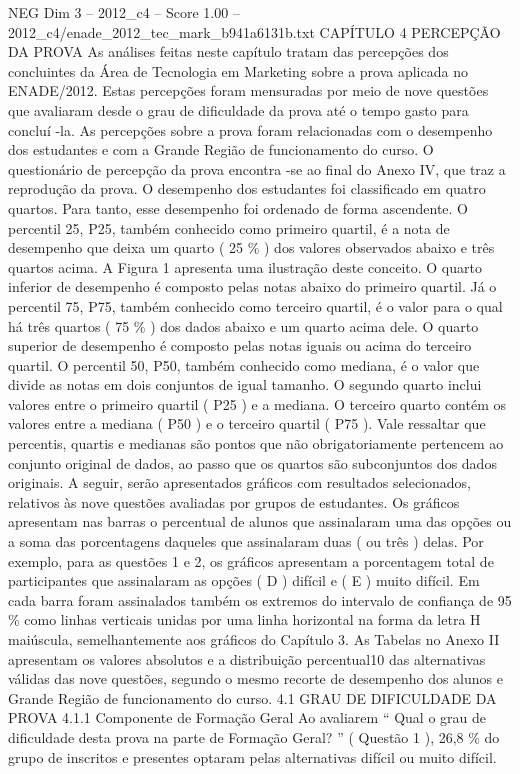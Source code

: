 \begin{textsample}{NEG Dim 3 – 2012\_c4 – Score 1.00 – 2012\_c4/enade\_2012\_tec\_mark\_b941a6131b.txt}  \label{ex:f3_neg_130}
CAPÍTULO 4 PERCEPÇÃO DA PROVA As análises feitas neste capítulo tratam das percepções dos concluintes da Área de Tecnologia em Marketing sobre a prova aplicada no ENADE/2012.
Estas percepções foram mensuradas por meio de nove questões que avaliaram desde o grau de dificuldade da prova até o tempo gasto para concluí -la.
As percepções sobre a prova foram relacionadas com o desempenho dos estudantes e com a Grande Região de funcionamento do curso.
O questionário de percepção da prova encontra -se ao final do Anexo IV, que traz a reprodução da prova.
O desempenho dos estudantes foi classificado em quatro quartos.
Para tanto, esse desempenho foi ordenado de forma ascendente.
O percentil 25, P25, também conhecido como primeiro quartil, é a nota de desempenho que deixa um quarto ( 25 \% ) dos valores observados abaixo e três quartos acima.
A Figura 1 apresenta uma ilustração deste conceito.
O quarto inferior de desempenho é composto pelas notas abaixo do primeiro quartil.
Já o percentil 75, P75, também conhecido como terceiro quartil, é o valor para o qual há três quartos ( 75 \% ) dos dados abaixo e um quarto acima dele.
O quarto superior de desempenho é composto pelas notas iguais ou acima do terceiro quartil.
O percentil 50, P50, também conhecido como mediana, é o valor que divide as notas em dois conjuntos de igual tamanho.
O segundo quarto inclui valores entre o primeiro quartil ( P25 ) e a mediana.
O terceiro quarto contém os valores entre a mediana ( P50 ) e o terceiro quartil ( P75 ).
Vale ressaltar que percentis, quartis e medianas são pontos que não obrigatoriamente pertencem ao conjunto original de dados, ao passo que os quartos são subconjuntos dos dados originais.
A seguir, serão apresentados gráficos com resultados selecionados, relativos às nove questões avaliadas por grupos de estudantes.
Os gráficos apresentam nas barras o percentual de alunos que assinalaram uma das opções ou a soma das porcentagens daqueles que assinalaram duas ( ou três ) delas.
Por exemplo, para as questões 1 e 2, os gráficos apresentam a porcentagem total de participantes que assinalaram as opções ( D ) difícil e ( E ) muito difícil.
Em cada barra foram assinalados também os extremos do intervalo de confiança de 95 \% como linhas verticais unidas por uma linha horizontal na forma da letra H maiúscula, semelhantemente aos gráficos do Capítulo 3.
As Tabelas no Anexo II apresentam os valores absolutos e a distribuição percentual10 das alternativas válidas das nove questões, segundo o mesmo recorte de desempenho dos alunos e Grande Região de funcionamento do curso. 4.1 GRAU DE DIFICULDADE DA PROVA 4.1.1 Componente de Formação Geral Ao avaliarem “ Qual o grau de dificuldade desta prova na parte de Formação Geral? ” ( Questão 1 ), 26,8 \% do grupo de inscritos e presentes optaram pelas alternativas difícil ou muito difícil.

\end{textsample}
